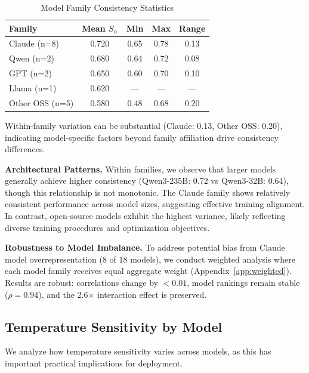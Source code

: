 \documentclass[sigconf,anonymous,review]{acmart}
\begin{document}
\begin{table}[t]
\centering
\caption{Model Family Consistency Statistics}
\label{tab:model_family}
\small
\begin{tabular}{@{}lcccc@{}}
\toprule
\textbf{Family} & \textbf{Mean $S_\alpha$} & \textbf{Min} & \textbf{Max} & \textbf{Range} \\
\midrule
Claude (n=8) & 0.720 & 0.65 & 0.78 & 0.13 \\
Qwen (n=2) & 0.680 & 0.64 & 0.72 & 0.08 \\
GPT (n=2) & 0.650 & 0.60 & 0.70 & 0.10 \\
Llama (n=1) & 0.620 & --- & --- & --- \\
Other OSS (n=5) & 0.580 & 0.48 & 0.68 & 0.20 \\
\bottomrule
\end{tabular}
\vspace{0.3em}

\raggedright\footnotesize Within-family variation can be substantial (Claude: 0.13, Other OSS: 0.20), indicating model-specific factors beyond family affiliation drive consistency differences.
\end{table}

\textbf{Architectural Patterns.} Within families, we observe that larger models generally achieve higher consistency (Qwen3-235B: 0.72 vs Qwen3-32B: 0.64), though this relationship is not monotonic. The Claude family shows relatively consistent performance across model sizes, suggesting effective training alignment. In contrast, open-source models exhibit the highest variance, likely reflecting diverse training procedures and optimization objectives.

\textbf{Robustness to Model Imbalance.} To address potential bias from Claude model overrepresentation (8 of 18 models), we conduct weighted analysis where each model family receives equal aggregate weight (Appendix~\ref{app:weighted}). Results are robust: correlations change by $< 0.01$, model rankings remain stable ($\rho = 0.94$), and the 2.6$\times$ interaction effect is preserved.

\subsection{Temperature Sensitivity by Model}

We analyze how temperature sensitivity varies across models, as this has important practical implications for deployment.
\end{document}
